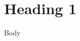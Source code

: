 \documentclass[12pt]{article}
\begin{document}

\tableofcontents

\section{Heading 1}

Body
\end{document}
